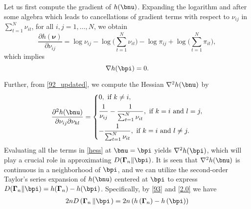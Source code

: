 \documentclass[10pt, twocolumn]{IEEEtran}
\begin{document}
\begin{IEEEproof}
	Let us first compute the gradient of $h(\bnu)$. Expanding the logarithm and after some algebra which leads to
cancellations of gradient terms with respect to $\nu _{ij}$ in $\sum_{t
  = 1}^N\nu _{it}$, for all $i,j = 1, \ldots ,N$, we obtain
\begin{equation}
\frac{{\partial h( {\boldsymbol{\nu }} )}}{{\partial {\nu _{ij}}}} =
\log {\nu _{ij}} - \log \bigg( {\sum\limits_{t = 1}^N {{\nu _{it}}} } \bigg) -
\log {\pi _{ij}}  
+ \log \bigg( {\sum_{t = 1}^N {{\pi _{it}}} } \bigg),  \label{92_updated}
\end{equation}
which implies
\begin{equation}
  \nabla h( {\bpi} ) = 0.
\label{93}
\end{equation}

Further, from \eqref{92_updated}, we compute the Hessian ${\nabla ^2}h(
{\bnu} )$ by
\begin{align}\frac{{{\partial ^2}h( {\bnu} )}}{{\partial {\nu
        _{ij}}\partial {\nu _{kl}}}} = \left\{ \begin{gathered} 
0,{\text{ if }}k \ne i, \hfill \\
\frac{1}{{{\nu _{ij}}}} - \frac{1}{{\sum_{t = 1}^N {{\nu _{it}}}
  }},{\text{ if }}k = i{\text{ and }}l = j, \hfill \\ 
- \frac{1}{{\sum_{t = 1}^N {{\nu _{it}}} }},{\text{ if }}k = i{\text{
    and }}l \ne j. \hfill \\  
\end{gathered}  \right. \label{hess}
\end{align}
Evaluating all the terms in \eqref{hess} at $\bnu = {\bpi}$ yields
${\nabla ^2}h( {\bpi})$, which will play a crucial role in approximating
${D}( {{\boldsymbol{\Gamma} _n} \| {{{\bpi}}} })$.
It is seen that ${\nabla
  ^2}h( {\bnu})$ is continuous in a neighborhood
of ${\bpi}$, and we can utilize the second-order Taylor's
series expansion of $h( {\bnu} )$ centered at
${\bpi}$ to express ${D}( {{\boldsymbol{\Gamma}
      _n}\| {{{\bpi}}}}) =
h(\boldsymbol{\Gamma} _n) - h( {\bpi}  )$. Specifically, by \eqref{93} and \eqref{2.0} we have
\begin{align}
2nD\left( {{\boldsymbol{\Gamma} _n}\left\| \bpi  \right.} \right) &= 2n\left( {h\left( {{\boldsymbol{\Gamma} _n}} \right) - h\left( \bpi  \right)} \right) \notag \\

\end{align}
\end{IEEEproof}
\end{document}
